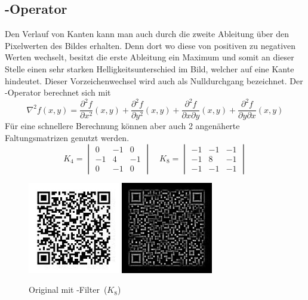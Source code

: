 \subsection*{-Operator}
Den Verlauf von Kanten kann man auch durch die zweite Ableitung über den Pixelwerten des Bildes erhalten.
Denn dort wo diese von positiven zu negativen Werten wechselt, besitzt die erste Ableitung ein Maximum und somit an dieser Stelle einen sehr starken Helligkeitsunterschied im Bild, welcher auf eine Kante hindeutet.
Dieser Vorzeichenwechsel wird auch als Nulldurchgang bezeichnet.
Der -Operator berechnet sich mit
\begin{equation}
  \nabla^2 f(x,y) = \frac{\partial^2 f}{\partial x^2}(x,y) + \frac{\partial^2 f}{\partial y^2}(x,y) + \frac{\partial^2 f}{\partial x \partial y}(x,y) + \frac{\partial^2 f}{\partial y \partial x}(x,y)
\end{equation}
Für eine schnellere Berechnung können aber auch 2 angenäherte Faltungsmatrizen genutzt werden.
\begin{equation}
  K_4 = \begin{vmatrix}
     0 & -1 &  0 \\
    -1 &  4 & -1 \\
     0 & -1 &  0
  \end{vmatrix}
  \quad
  K_8 = \begin{vmatrix}
    -1 & -1 & -1 \\
    -1 &  8 & -1 \\
    -1 & -1 & -1
  \end{vmatrix}
\end{equation}
\begin{figure}[H]
  \centering
  \includegraphics[height=4cm]{img/QR/perfect_03.jpg}
  \includegraphics[height=4cm]{img/QR/qr-laplace.jpg}
  \caption[Beispiel -Filter]{Original mit -Filter~($K_8$)}
  \label{fig:laplace}
\end{figure}



